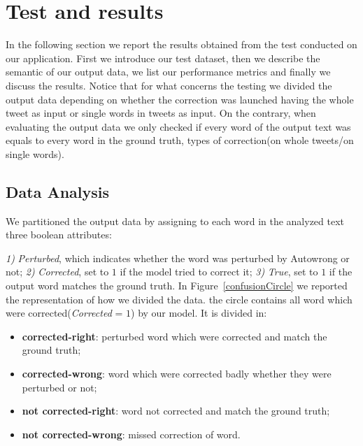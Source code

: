 \documentclass[12pt]{article}
\begin{document}

\section{Test and results}\label{analysis}
In the following section we report the results obtained from the test conducted
on our application. First we introduce our test dataset, then we
describe the semantic of our output data, we list our performance metrics and
finally we discuss the results.
Notice that for what concerns the testing we divided the output data depending
on whether the correction was launched having the whole tweet as input or single
words in tweets as input. On the contrary, when evaluating the output data we
only checked if every word of the output text was equals to every word in the ground truth,  types
of correction(on whole tweets/on single words).

\subsection{Data Analysis}\label{dataAnal}


We partitioned the output data by assigning to each word in the analyzed text
three boolean attributes:

\textit{1)} \emph{Perturbed}, which indicates whether the word was
perturbed by Autowrong or not; \textit{2)}
\emph{Corrected}, set to $1$ if the model tried to correct it; \textit{3)}
\emph{True}, set to $1$ if the output word matches the ground truth.
In Figure~\ref{confusionCircle} we reported the representation of how we divided the data.
the circle contains all word which were corrected(\emph{Corrected} = $1$) by our
model.
It is divided in:
\begin{itemize} 
	\item \textbf{corrected-right}: perturbed word which were corrected and match
	the ground truth;
	\item \textbf{corrected-wrong}: word which were corrected badly whether they
	were perturbed or not;
	\item \textbf{not corrected-right}: word not corrected and match the
	ground truth;
	\item \textbf{not corrected-wrong}: missed correction of word.
\end{itemize}
\end{document}
